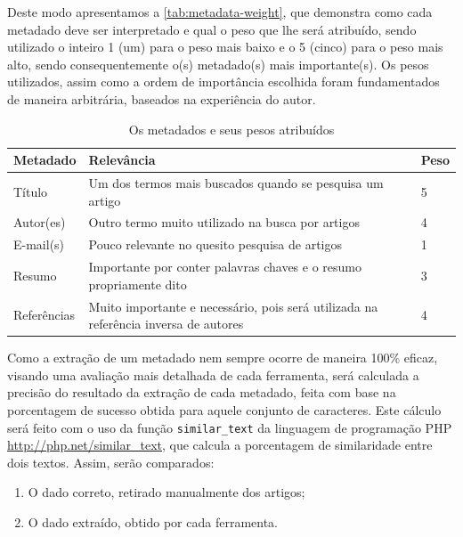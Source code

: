 Deste modo apresentamos a \autoref{tab:metadata-weight}, que demonstra como cada metadado deve ser interpretado e qual o peso que lhe será atribuído, sendo utilizado o inteiro 1 (um) para o peso mais baixo e o 5 (cinco) para o peso mais alto, sendo consequentemente o(s) metadado(s) mais importante(s). Os pesos utilizados, assim como a ordem de importância escolhida foram fundamentados de maneira arbitrária, baseados na experiência do autor.


\begin{table}
    \caption{Os metadados e seus pesos atribuídos}
    \begin{center}
        \begin{tabular}{|p{3cm}|p{8cm}|C{1cm}|}
            \hline \textbf{Metadado} & \textbf{Relevância} & \textbf{Peso} \\ 
            \hline Título & Um dos termos mais buscados quando se pesquisa um artigo & 5 \\
            \hline Autor(es) & Outro termo muito utilizado na busca por artigos & 4 \\
            \hline E-mail(s) & Pouco relevante no quesito pesquisa de artigos & 1 \\
            \hline Resumo & Importante por conter palavras chaves e o resumo propriamente dito & 3 \\
            \hline Referências & Muito importante e necessário, pois será utilizada na referência inversa de autores & 4 \\
            \hline 
        \end{tabular} 
    \end{center}
    \label{tab:metadata-weight}
\end{table}

Como a extração de um metadado nem sempre ocorre de maneira 100\% eficaz, visando uma avaliação mais detalhada de cada ferramenta, será calculada a precisão do resultado da extração de cada metadado, feita com base na porcentagem de sucesso obtida para aquele conjunto de caracteres. Este cálculo será feito com o uso da função \texttt{similar\_text} da linguagem de programação PHP \url{http://php.net/similar_text}, que calcula a porcentagem de similaridade entre dois textos. Assim, serão comparados:

\begin{enumerate}
    \item O dado correto, retirado manualmente dos artigos;
    \item O dado extraído, obtido por cada ferramenta.
\end{enumerate}

